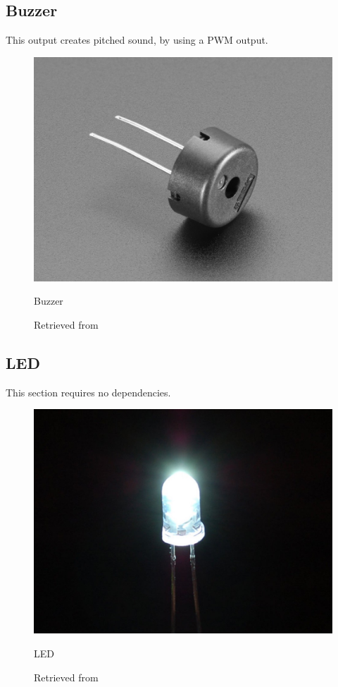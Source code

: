 \subsection{Buzzer}

This output creates pitched sound, by using a PWM output.

\begin{figure}[ht]
  \centering
  \includegraphics[width=0.75\linewidth,height=0.25\textheight,keepaspectratio]{images/materials-adafruit-buzzer.jpg}
  \caption{Buzzer}
  \caption*{Retrieved from \cite{website-materials-adafruit-buzzer}}
  \label{fig:materials-adafruit-buzzer}
\end{figure}

\subsection{LED}

This section requires no dependencies.

\begin{figure}[ht]
  \centering
  \includegraphics[width=0.75\linewidth,height=0.25\textheight,keepaspectratio]{images/materials-adafruit-led.jpg}
  \caption{LED}
  \caption*{Retrieved from \cite{website-materials-adafruit-led}}
  \label{fig:materials-adafruit-led}
\end{figure}

